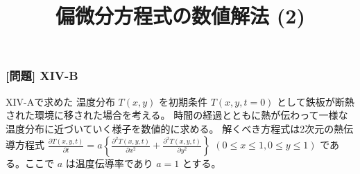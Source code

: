 \documentclass[dvipdfmx,aspectratio=169,20pt]{beamer}
\newcommand{\myfontsetting}[3]{{\fontsize{#1}{#2}\selectfont #3}}
\begin{document}
\graphicspath{{figs/}}


\title{\myfontsetting{32pt}{32pt}{偏微分方程式の数値解法 (2)}}



\date[\todey]{}

\frame{\titlepage}

\begin{frame}
\frametitle{[問題] X\hspace{-.1em}I\hspace{-.1em}V-B}

\myfontsetting{14pt}{14pt}{
X\hspace{-.1em}I\hspace{-.1em}V-Aで求めた 温度分布 $T(x,y)$ を初期条件 $T(x,y,t=0)$ として鉄板が断熱された環境に移された場合を考える。
時間の経過とともに熱が伝わって一様な温度分布に近づいていく様子を数値的に求める。
解くべき方程式は2次元の熱伝導方程式 $\frac{\partial T(x,y,t)}{\partial t} = a \left\{ \frac{\partial^2 T(x,y,t)}{\partial x^2} + \frac{\partial^2 T(x,y,t)}{\partial y^2}\right\}$ $(0\le x \le 1, 0\le y \le 1)$ である。ここで $a$ は温度伝導率であり $a=1$ とする。
}
\end{frame}
\end{document}
